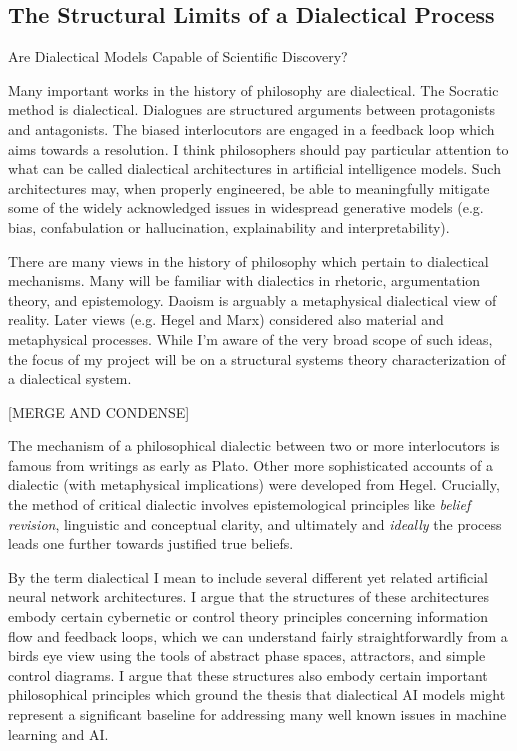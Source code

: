 \documentclass[11pt, oneside]{article}   	%
\begin{document}




\subsection{The Structural Limits of a Dialectical Process}

Are Dialectical Models Capable of Scientific Discovery?


Many important works in the history of philosophy are dialectical.  The Socratic method is dialectical.  Dialogues are structured arguments between protagonists and antagonists.  The biased interlocutors are engaged in a feedback loop which aims towards a resolution.  I think philosophers should pay particular attention to what can be called dialectical architectures in artificial intelligence models.  Such architectures may, when properly engineered, be able to meaningfully mitigate some of the widely acknowledged issues in widespread generative models (e.g. bias, confabulation or hallucination, explainability and interpretability).





There are many views in the history of philosophy which pertain to dialectical mechanisms.  Many will be familiar with dialectics in rhetoric, argumentation theory, and epistemology.  Daoism is arguably a metaphysical dialectical view of reality.  Later views (e.g. Hegel and Marx) considered also material and metaphysical processes.  While I'm aware of the very broad scope of such ideas, the focus of my project will be on a structural systems theory characterization of a dialectical system.  

[MERGE AND CONDENSE]

The mechanism of a philosophical dialectic between two or more interlocutors is famous from writings as early as Plato.  Other more sophisticated accounts of a dialectic (with metaphysical implications) were developed from Hegel.  \citep{sep-hegel-dialectics}  Crucially, the method of critical dialectic involves epistemological principles like \emph{belief revision}, linguistic and conceptual clarity, and ultimately and \emph{ideally} the process leads one further towards justified true beliefs. 








By the term dialectical I mean to include several different yet related artificial neural network architectures.  I argue that the structures of these architectures embody certain cybernetic or control theory principles concerning information flow and feedback loops, which we can understand fairly straightforwardly from a birds eye view using the tools of abstract phase spaces, attractors, and simple control diagrams.  I argue that these structures also embody certain important philosophical principles which ground the thesis that dialectical AI models might represent a significant baseline for addressing many well known issues in machine learning and AI.
\end{document}
